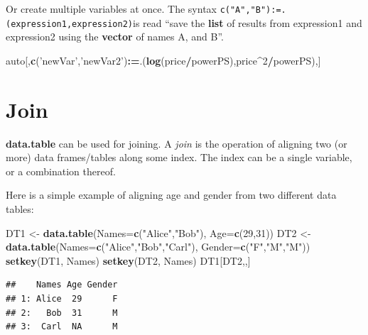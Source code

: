 \documentclass[]{book}
\newenvironment{Shaded}{\begin{snugshade}}{\end{snugshade}}
\newcommand{\KeywordTok}[1]{\textcolor[rgb]{0.13,0.29,0.53}{\textbf{#1}}}
\newcommand{\DataTypeTok}[1]{\textcolor[rgb]{0.13,0.29,0.53}{#1}}
\newcommand{\DecValTok}[1]{\textcolor[rgb]{0.00,0.00,0.81}{#1}}
\newcommand{\StringTok}[1]{\textcolor[rgb]{0.31,0.60,0.02}{#1}}
\newcommand{\OperatorTok}[1]{\textcolor[rgb]{0.81,0.36,0.00}{\textbf{#1}}}
\newcommand{\ErrorTok}[1]{\textcolor[rgb]{0.64,0.00,0.00}{\textbf{#1}}}
\newcommand{\NormalTok}[1]{#1}
\theoremstyle{definition}
\theoremstyle{definition}
\theoremstyle{definition}
\theoremstyle{remark}
\begin{document}
Or create multiple variables at once. The syntax
\texttt{c("A","B"):=.(expression1,expression2)}is read ``save the
\textbf{list} of results from expression1 and expression2 using the
\textbf{vector} of names A, and B''.

\begin{Shaded}
\begin{Highlighting}[]
\NormalTok{auto[,}\KeywordTok{c}\NormalTok{(}\StringTok{'newVar'}\NormalTok{,}\StringTok{'newVar2'}\NormalTok{)}\OperatorTok{:}\ErrorTok{=}\NormalTok{.(}\KeywordTok{log}\NormalTok{(price}\OperatorTok{/}\NormalTok{powerPS),price}\OperatorTok{^}\DecValTok{2}\OperatorTok{/}\NormalTok{powerPS),]}
\end{Highlighting}
\end{Shaded}

\section{Join}\label{join}

\textbf{data.table} can be used for joining. A \emph{join} is the
operation of aligning two (or more) data frames/tables along some index.
The index can be a single variable, or a combination thereof.

Here is a simple example of aligning age and gender from two different
data tables:

\begin{Shaded}
\begin{Highlighting}[]
\NormalTok{DT1 <-}\StringTok{ }\KeywordTok{data.table}\NormalTok{(}\DataTypeTok{Names=}\KeywordTok{c}\NormalTok{(}\StringTok{"Alice"}\NormalTok{,}\StringTok{"Bob"}\NormalTok{), }\DataTypeTok{Age=}\KeywordTok{c}\NormalTok{(}\DecValTok{29}\NormalTok{,}\DecValTok{31}\NormalTok{))}
\NormalTok{DT2 <-}\StringTok{ }\KeywordTok{data.table}\NormalTok{(}\DataTypeTok{Names=}\KeywordTok{c}\NormalTok{(}\StringTok{"Alice"}\NormalTok{,}\StringTok{"Bob"}\NormalTok{,}\StringTok{"Carl"}\NormalTok{), }\DataTypeTok{Gender=}\KeywordTok{c}\NormalTok{(}\StringTok{"F"}\NormalTok{,}\StringTok{"M"}\NormalTok{,}\StringTok{"M"}\NormalTok{))}
\KeywordTok{setkey}\NormalTok{(DT1, Names)}
\KeywordTok{setkey}\NormalTok{(DT2, Names)}
\NormalTok{DT1[DT2,,] }
\end{Highlighting}
\end{Shaded}

\begin{verbatim}
##    Names Age Gender
## 1: Alice  29      F
## 2:   Bob  31      M
## 3:  Carl  NA      M
\end{verbatim}
\end{document}
